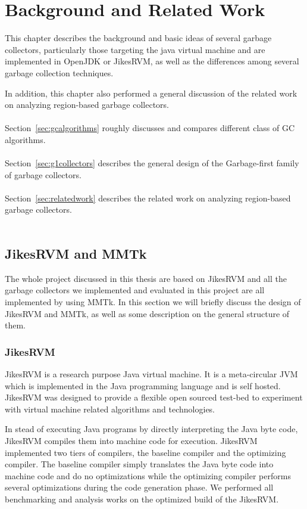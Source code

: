 \chapter{Background and Related Work}
\label{cha:background}

This chapter describes the background and basic ideas of several garbage collectors,
particularly those targeting the java virtual machine and are implemented in OpenJDK or JikesRVM,
as well as the differences among several garbage collection techniques.

In addition, this chapter also performed a general discussion of the related work
on analyzing region-based garbage collectors.
\\\\
Section~\ref{sec:gcalgorithms} roughly discusses and compares different class of GC algorithms.
\\\\
Section~\ref{sec:g1collectors} describes the general design of the Garbage-first family of garbage collectors.
\\\\
Section~\ref{sec:relatedwork} describes the related work on analyzing region-based garbage collectors.
\\\\

\section{JikesRVM and MMTk}

The whole project discussed in this thesis are based on JikesRVM and all the garbage collectors
we implemented and evaluated in this project are all implemented by using MMTk.
In this section we will briefly discuss the design of JikesRVM and MMTk,
as well as some description on the general structure of them.

\subsection{JikesRVM}

JikesRVM is a research purpose Java virtual machine. It is a meta-circular JVM
which is implemented in the Java programming language and is self hosted.
JikesRVM was designed to provide a flexible open sourced test-bed to
experiment with virtual machine related algorithms and technologies.

In stead of executing Java programs by directly interpreting the Java byte code,
JikesRVM compiles them into machine code for execution.
JikesRVM implemented two tiers of compilers, the baseline compiler and the optimizing compiler.
The baseline compiler simply translates the Java byte code into machine code and do no
optimizations while the optimizing compiler performs several optimizations during the
code generation phase. We performed all benchmarking and analysis works on the
optimized build of the JikesRVM.

